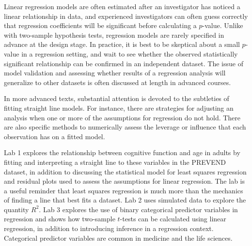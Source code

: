 Linear regression models are often estimated after an investigator has noticed a linear relationship in data, and experienced investigators can often guess correctly that regression coefficients will be significant before calculating a $p$-value. Unlike with two-sample hypothesis tests, regression models are rarely specified in advance at the design stage. In practice, it is best to be skeptical about a small $p$-value in a regression setting, and wait to see whether the observed statistically significant relationship can be confirmed in an independent dataset. The issue of model validation and assessing whether results of a regression analysis will generalize to other datasets is often discussed at length in advanced courses.

In more advanced texts, substantial attention is devoted to the subtleties of fitting straight line models. For instance, there are strategies for adjusting an analysis when one or more of the assumptions for regression do not hold. There are also specific methods to numerically assess the leverage or influence that each observation has on a fitted model.

Lab 1 explores the relationship between cognitive function and age in adults by fitting and interpreting a straight line to these variables in the PREVEND dataset, in addition to discussing the statistical model for least squares regression and residual plots used to assess the assumptions for linear regression.  The lab is a useful reminder that least squares regression is much more than the mechanics of finding a line that best fits a dataset.  Lab 2 uses simulated data to explore the quantity $R^2$. Lab 3 explores the use of binary categorical predictor variables in regression and shows how two-sample $t$-tests can be calculated using linear regression, in addition to introducing inference in a regression context. Categorical predictor variables are common in medicine and the life sciences. 

